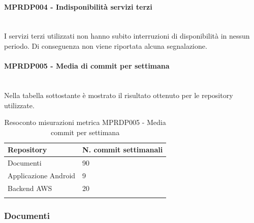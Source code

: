 \paragraph{MPRDP004 - Indisponibilità servizi terzi}\mbox{}\\[0.4cm]
I servizi terzi utilizzati non hanno subito interruzioni di disponibilità in nessun periodo. Di conseguenza non viene riportata alcuna segnalazione.
\paragraph{MPRDP005 - Media di commit per settimana}\mbox{}\\[0.4cm]
Nella tabella sottostante è mostrato il risultato ottenuto per le repository utilizzate.
\begin{center}%
	\centering
	\renewcommand{\arraystretch}{1.5}
	\begin{longtable}{  p{5cm}  p{5cm} }
		\rowcolor{tableHeadYellow}
		\textbf{Repository}   & \textbf{N. commit settimanali} \\ 
		\endhead
		Documenti    &           90                      \\
		Applicazione Android         & 9             \\
		Backend AWS    & 20                           \\
		\rowcolor{white}
		\caption{Resoconto misurazioni metrica MPRDP005 - Media commit per settimana}
	\end{longtable}
\end{center}
\subsubsection{Documenti}
